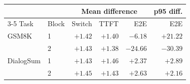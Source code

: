 \begin{tabular}{@{}llrrrr@{}}
\toprule
 & & \multicolumn{3}{c}{Mean difference} & p95 diff. \\
\cmidrule(lr){3-5}
Task & Block & Switch & TTFT & E2E & E2E \\
\midrule
GSM8K & 1 & \(+1.42\) & \(+1.40\) & \(-6.18\) & \(+21.22\) \\
 & 2 & \(+1.43\) & \(+1.38\) & \(-24.66\) & \(-30.39\) \\
\addlinespace[2pt]
DialogSum & 1 & \(+1.43\) & \(+1.46\) & \(+2.37\) & \(+2.89\) \\
 & 2 & \(+1.45\) & \(+1.43\) & \(+2.63\) & \(+2.16\) \\
\bottomrule
\end{tabular}
